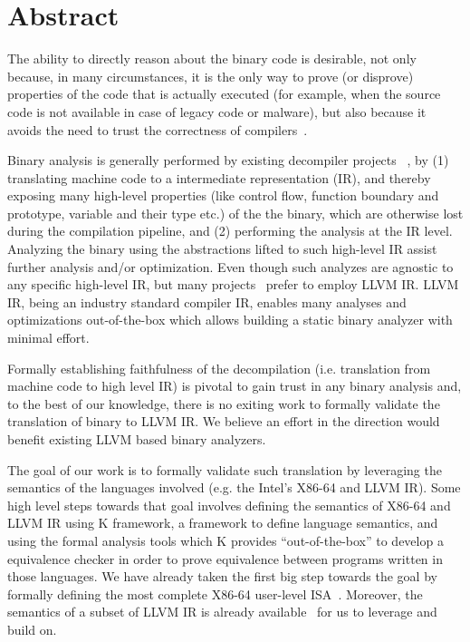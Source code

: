 \section{Abstract}

The ability to directly reason about the binary code is desirable, not only
because, in many circumstances, it is the only way to prove (or disprove)
  properties of the code that is actually executed (for example, when the
      source code is not available in case of legacy code or malware), but also
  because it avoids the need to trust the correctness of compilers~\cite{Thompson,WYSINWYE}.

Binary analysis is generally performed by existing decompiler projects
~\cite{McSema:Recon14,Remill,Angr1,BAP:CAV11,Radare2}, by (1) translating
machine code to a intermediate representation (IR), and thereby exposing many
high-level properties (like control flow, function boundary and prototype,
    variable and their type etc.) of the the binary, which are otherwise lost
during the compilation pipeline, and (2) performing the analysis at the IR
level.  Analyzing the binary using the abstractions lifted to such high-level
IR assist further analysis and/or optimization. Even though such analyzes are
agnostic to any specific high-level IR, but many
projects~\cite{McSema:Recon14,Remill,FCD,reopt,llvm-mctoll} prefer to employ
LLVM IR. LLVM IR, being an industry standard compiler IR, enables many analyses
and optimizations out-of-the-box which allows building a static binary analyzer
with minimal effort.

Formally establishing faithfulness of the decompilation (i.e. translation from
    machine code to high level IR) is pivotal to gain trust in any binary
analysis and, to the best of our knowledge, there is no exiting work to formally
validate the translation of binary to LLVM IR.%
We believe an effort in the direction
would benefit existing LLVM based binary analyzers.

The goal of our work is to formally validate such translation by leveraging the
semantics of the languages involved (e.g. the Intel's X86-64 and LLVM IR). Some
high level steps towards that goal involves defining the semantics of X86-64
and LLVM IR using K framework, a framework to define language semantics, and
using the formal analysis tools which K provides ``out-of-the-box'' to develop a
equivalence checker in order to prove equivalence between programs written in those languages.  We have
already taken the first big step towards the goal by formally defining the most
complete X86-64 user-level ISA~\cite{DasguptaAdve:PLDI19}. Moreover, the
semantics of a subset of LLVM IR is already available~\cite{LLVMSEMA} for us to
leverage and build on.


